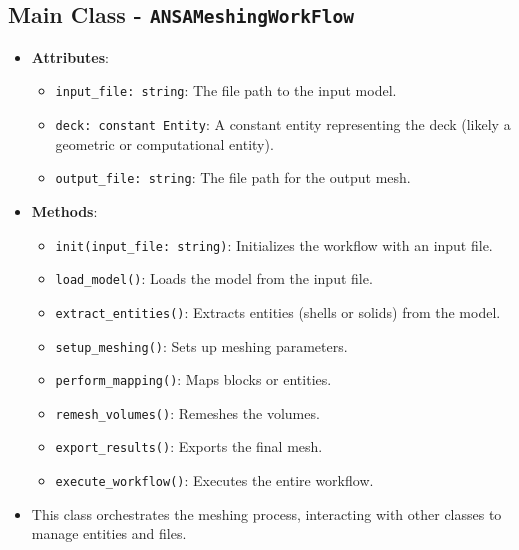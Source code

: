 \documentclass{book}
\begin{document}
\begin{itemize}[leftmargin=*,label=\textbullet]
\begin{itemize}
\subsection{Main Class - \texttt{ANSAMeshingWorkFlow}}
\begin{itemize}
    \item \textbf{Attributes}:
    \begin{itemize}
        \item \texttt{input\_file: string}: The file path to the input model.
        \item \texttt{deck: constant Entity}: A constant entity representing the deck (likely a geometric or computational entity).
        \item \texttt{output\_file: string}: The file path for the output mesh.
    \end{itemize}
    \item \textbf{Methods}:
    \begin{itemize}
        \item \texttt{init(input\_file: string)}: Initializes the workflow with an input file.
        \item \texttt{load\_model()}: Loads the model from the input file.
        \item \texttt{extract\_entities()}: Extracts entities (shells or solids) from the model.
        \item \texttt{setup\_meshing()}: Sets up meshing parameters.
        \item \texttt{perform\_mapping()}: Maps blocks or entities.
        \item \texttt{remesh\_volumes()}: Remeshes the volumes.
        \item \texttt{export\_results()}: Exports the final mesh.
        \item \texttt{execute\_workflow()}: Executes the entire workflow.
    \end{itemize}
    \item This class orchestrates the meshing process, interacting with other classes to manage entities and files.
\end{itemize}


\end{itemize}
\end{itemize}
\end{document}
